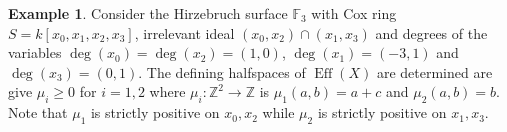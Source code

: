 \documentclass[12pt]{amsart}
\theoremstyle{definition}
\newtheorem{example}[lemma]{Example}
\theoremstyle{remark}
\newtheorem{remark}[lemma]{Remark}
\newcommand{\ZZ}{\mathbb Z}
\newcommand{\NE}{\overline{\operatorname{NE}}}
\newcommand{\Eff}{\operatorname{Eff}}
\newcommand{\Pic}{\operatorname{Pic}}
\begin{document}
%
%
\begin{example}
Consider the Hirzebruch surface $\mathbb F_3$ with Cox ring $S=k[x_0,x_1,x_2,x_3]$, irrelevant ideal $(x_0,x_2)\cap (x_1,x_3)$ and degrees of the variables $\deg(x_0)=\deg(x_2) = (1,0)$, $\deg(x_1)=(-3,1)$ and $\deg(x_3)=(0,1)$.  
The defining halfspaces of $\Eff(X)$ are determined are give $\mu_i\geq 0$ for $i=1,2$ where $\mu_i:\ZZ^2\to \ZZ$ is $\mu_1(a,b)=a+c$ and $\mu_2(a,b) = b$.  Note that $\mu_1$ is strictly positive on $x_0,x_2$ while $\mu_2$ is strictly positive on $x_1, x_3$.
\end{example}
\end{document}
